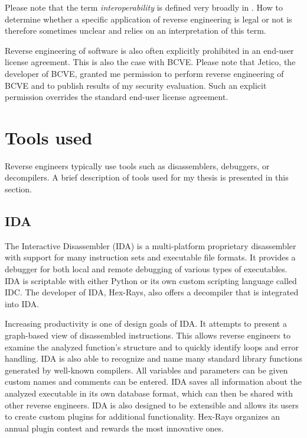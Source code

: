 \documentclass[thesis=B,english]{FITthesis}[2012/10/20]
\begin{document}
	Please note that the term \textit{interoperability} is defined very broadly in \cite{law}. How to determine whether a specific application of reverse engineering is legal or not is therefore sometimes unclear and relies on an interpretation of this term.
	
	
	Reverse engineering of software is also often explicitly prohibited in an end-user license agreement. This is also the case with BCVE. Please note that Jetico, the developer of BCVE, granted me permission to perform reverse engineering of BCVE and to publish results of my security evaluation. Such an explicit permission overrides the standard end-user license agreement.
	
	\section{Tools used}
	
	Reverse engineers typically use tools such as disassemblers, debuggers, or decompilers. A brief description of tools used for my thesis is presented in this section.
	
	\subsection{IDA}
	
	The Interactive Disassembler (IDA) is a multi-platform proprietary disassembler with support for many instruction sets and executable file formats. It provides a debugger for both local and remote debugging of various types of executables. IDA is scriptable with either Python or its own custom scripting language called IDC. The developer of IDA, Hex-Rays, also offers a decompiler that is integrated into IDA.
	
	Increasing productivity is one of design goals of IDA. It attempts to present a graph-based view of disassembled instructions. This allows reverse engineers to examine the analyzed function's structure and to quickly identify loops and error handling. IDA is also able to recognize and name many standard library functions generated by well-known compilers. All variables and parameters can be given custom names and comments can be entered. IDA saves all information about the analyzed executable in its own database format, which can then be shared with other reverse engineers. IDA is also designed to be extensible and allows its users to create custom plugins for additional functionality. Hex-Rays organizes an annual plugin contest and rewards the most innovative ones.
	
\end{document}
